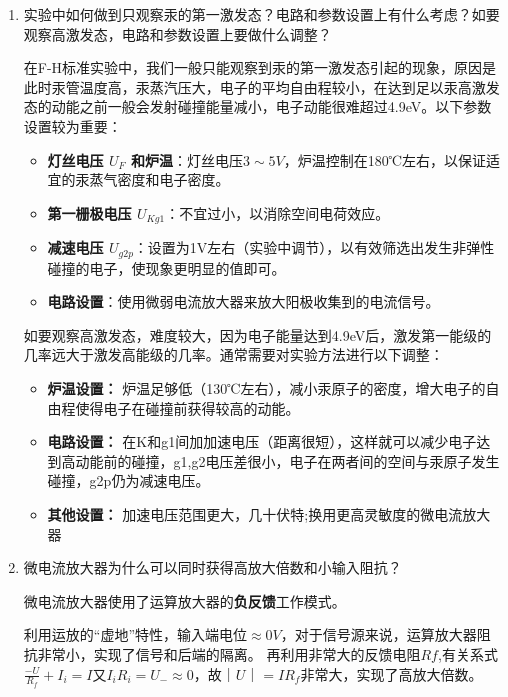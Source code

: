 \documentclass[12pt]{article}
\newcommand{\question}[1]{{\CJKfamily{kaishu}#1}}
\begin{document}
\begin{enumerate}
    \item \question{实验中如何做到只观察汞的第一激发态？电路和参数设置上有什么考虑？如要观察高激发态，电路和参数设置上要做什么调整？}
    \par
    \hspace{1em}在F-H标准实验中，我们一般只能观察到汞的第一激发态引起的现象，原因是此时汞管温度高，汞蒸汽压大，电子的平均自由程较小，在达到足以汞高激发态的动能之前一般会发射碰撞能量减小，电子动能很难超过4.9eV。以下参数设置较为重要：
    \begin{itemize}
        \item \textbf{灯丝电压 $U_F$ 和炉温}：灯丝电压$3 \sim 5V$，炉温控制在180℃左右，以保证适宜的汞蒸气密度和电子密度。
        \item \textbf{第一栅极电压 $U_{Kg1}$}：不宜过小，以消除空间电荷效应。
        \item \textbf{减速电压 $U_{g2p}$}：设置为1V左右（实验中调节），以有效筛选出发生非弹性碰撞的电子，使现象更明显的值即可。
        \item \textbf{电路设置}：使用微弱电流放大器来放大阳极收集到的电流信号。

    \end{itemize}
    \par
    \hspace{1em}如要观察高激发态，难度较大，因为电子能量达到4.9eV后，激发第一能级的几率远大于激发高能级的几率。通常需要对实验方法进行以下调整：
    \begin{itemize}
        \item \textbf{炉温设置：} 炉温足够低（130℃左右），减小汞原子的密度，增大电子的自由程使得电子在碰撞前获得较高的动能。
        \item \textbf{电路设置：} 在K和g1间加加速电压（距离很短），这样就可以减少电子达到高动能前的碰撞，g1,g2电压差很小，电子在两者间的空间与汞原子发生碰撞，g2p仍为减速电压。
        \item \textbf{其他设置：} 加速电压范围更大，几十伏特;换用更高灵敏度的微电流放大器
    \end{itemize}

    
    \item \question{微电流放大器为什么可以同时获得高放大倍数和小输入阻抗？}
    \par
    微电流放大器使用了运算放大器的\textbf{负反馈}工作模式。
    \par
    利用运放的“虚地”特性，输入端电位$\approx 0V$，对于信号源来说，运算放大器阻抗非常小，实现了信号和后端的隔离。
    再利用非常大的反馈电阻$Rf$,有关系式$\frac{-U}{R_f}+I_i = I$又$I_iR_i=U_{-}\approx 0$，故$｜U｜=IR_f$非常大，实现了高放大倍数。
    

\end{enumerate}
\end{document}
